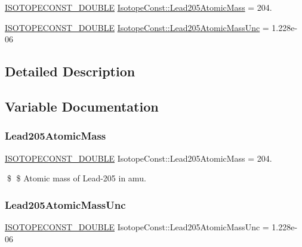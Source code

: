 \begin{DoxyCompactItemize}
\item 
\mbox{\hyperlink{group___isotope_const-_macros_ga8f45a7272ce02c0b4c65c44636ed719a}{I\+S\+O\+T\+O\+P\+E\+C\+O\+N\+S\+T\+\_\+\+D\+O\+U\+B\+LE}} \mbox{\hyperlink{group___isotope_const-_lead-_pb205_ga927d8d6c1d6b9033b44b6e12361c7969}{Isotope\+Const\+::\+Lead205\+Atomic\+Mass}} = 204.
\item 
\mbox{\hyperlink{group___isotope_const-_macros_ga8f45a7272ce02c0b4c65c44636ed719a}{I\+S\+O\+T\+O\+P\+E\+C\+O\+N\+S\+T\+\_\+\+D\+O\+U\+B\+LE}} \mbox{\hyperlink{group___isotope_const-_lead-_pb205_ga43e98fd17577dd915306b76a6ee70c6b}{Isotope\+Const\+::\+Lead205\+Atomic\+Mass\+Unc}} = 1.\+228e-\/06
\end{DoxyCompactItemize}


\subsection{Detailed Description}


\subsection{Variable Documentation}
\mbox{\label{group___isotope_const-_lead-_pb205_ga927d8d6c1d6b9033b44b6e12361c7969}} 
\subsubsection{\texorpdfstring{Lead205\+Atomic\+Mass}{Lead205AtomicMass}}
{\footnotesize\ttfamily \mbox{\hyperlink{group___isotope_const-_macros_ga8f45a7272ce02c0b4c65c44636ed719a}{I\+S\+O\+T\+O\+P\+E\+C\+O\+N\+S\+T\+\_\+\+D\+O\+U\+B\+LE}} Isotope\+Const\+::\+Lead205\+Atomic\+Mass = 204.}

\$ \$ Atomic mass of Lead-\/205 in amu. \mbox{\label{group___isotope_const-_lead-_pb205_ga43e98fd17577dd915306b76a6ee70c6b}} 
\subsubsection{\texorpdfstring{Lead205\+Atomic\+Mass\+Unc}{Lead205AtomicMassUnc}}
{\footnotesize\ttfamily \mbox{\hyperlink{group___isotope_const-_macros_ga8f45a7272ce02c0b4c65c44636ed719a}{I\+S\+O\+T\+O\+P\+E\+C\+O\+N\+S\+T\+\_\+\+D\+O\+U\+B\+LE}} Isotope\+Const\+::\+Lead205\+Atomic\+Mass\+Unc = 1.\+228e-\/06}

